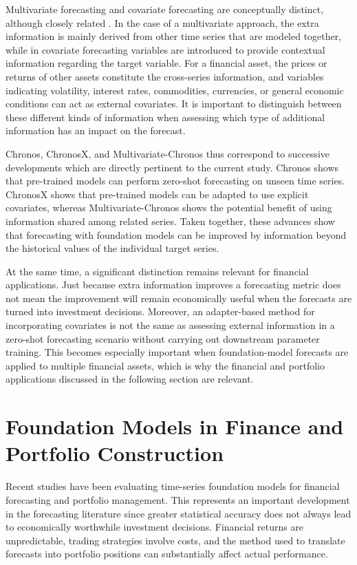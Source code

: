\documentclass[12pt,a4paper,twoside,openany]{book}
\begin{document}
Multivariate forecasting and covariate forecasting are conceptually distinct, although closely related \cite{das2026multivariate}. In the case of a multivariate approach, the extra information is mainly derived from other time series that are modeled together, while in covariate forecasting variables are introduced to provide contextual information regarding the target variable. For a financial asset, the prices or returns of other assets constitute the cross-series information, and variables indicating volatility, interest rates, commodities, currencies, or general economic conditions can act as external covariates. It is important to distinguish between these different kinds of information when assessing which type of additional information has an impact on the forecast.

Chronos, ChronosX, and Multivariate-Chronos thus correspond to successive developments which are directly pertinent to the current study. Chronos shows that pre-trained models can perform zero-shot forecasting on unseen time series. ChronosX shows that pre-trained models can be adapted to use explicit covariates, whereas Multivariate-Chronos shows the potential benefit of using information shared among related series. Taken together, these advances show that forecasting with foundation models can be improved by information beyond the historical values of the individual target series.

At the same time, a significant distinction remains relevant for financial applications. Just because extra information improves a forecasting metric does not mean the improvement will remain economically useful when the forecasts are turned into investment decisions. Moreover, an adapter-based method for incorporating covariates is not the same as assessing external information in a zero-shot forecasting scenario without carrying out downstream parameter training. This becomes especially important when foundation-model forecasts are applied to multiple financial assets, which is why the financial and portfolio applications discussed in the following section are relevant.


\section{Foundation Models in Finance and Portfolio
Construction}\label{foundation-models-in-finance-and-portfolio-construction}

Recent studies have been evaluating time-series foundation models for financial forecasting and portfolio management. This represents an important development in the forecasting literature since greater statistical accuracy does not always lead to economically worthwhile investment decisions. Financial returns are unpredictable, trading strategies involve costs, and the method used to translate forecasts into portfolio positions can substantially affect actual performance.
\end{document}
